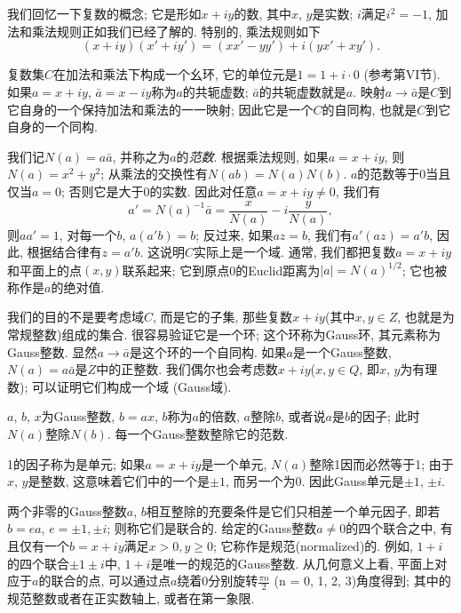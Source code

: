 \documentclass[12pt,a4paper]{book} %
\theoremstyle{remark}
\theoremstyle{example}
\theoremstyle{lemma}
\theoremstyle{corollary}
\numberwithin{theorem}{chapter}
\begin{document}
\chapter{} \label{chapter:13}
我们回忆一下复数的概念; 它是形如$x + iy$的数, 其中$x$, $y$是实数; $i$满足$i^2 = -1$, 加法和乘法规则正如我们已经了解的. 特别的, 乘法规则如下
\[
(x + iy)(x' + iy') = (xx' - yy') + i (yx' + xy').
\]

复数集$C$在加法和乘法下构成一个幺环, 它的单位元是$1 = 1 + i \cdot 0$ (参考第VI节). 如果$a = x + iy$, $\bar{a} = x - iy$称为$a$的共轭虚数; $\bar{a}$的共轭虚数就是$a$. 映射$a \rightarrow \bar{a}$是$C$到它自身的一个保持加法和乘法的一一映射; 因此它是一个$C$的自同构, 也就是$C$到它自身的一个同构.

我们记$N(a) = a\bar{a}$, 并称之为$a$的\emph{范数}. 根据乘法规则, 如果$a = x + iy$, 则$N(a) = x^2 + y^2$; 从乘法的交换性有$N(ab) = N(a)N(b)$. $a$的范数等于0当且仅当$a = 0$; 否则它是大于0的实数. 因此对任意$a = x + iy \neq 0$, 我们有
\[
a' = {N(a)}^{-1}\bar{a} = \frac{x}{N(a)} - i\frac{y}{N(a)},
\]
则$aa' = 1$, 对每一个$b$, $a(a'b) = b$; 反过来, 如果$az = b$, 我们有$a'(az) = a'b$, 因此, 根据结合律有$z = a'b$. 这说明$C$实际上是一个域. 通常, 我们都把复数$a = x + iy$和平面上的点$(x, y)$联系起来; 它到原点0的Euclid距离为$|a| = {N(a)}^{1/2}$; 它也被称作是$a$的绝对值.

我们的目的不是要考虑域$C$, 而是它的子集, 那些复数$x + iy$(其中$x, y \in Z$, 也就是为常规整数)组成的集合. 很容易验证它是一个环; 这个环称为Gauss环, 其元素称为Gauss整数. 显然$a \rightarrow \bar{a}$是这个环的一个自同构. 如果$a$是一个Gauss整数, $N(a) = a\bar{a}$是$Z$中的正整数. 我们偶尔也会考虑数$x + iy$($x, y \in Q$, 即$x$, $y$为有理数); 可以证明它们构成一个域 (Gauss域).

$a$, $b$, $x$为Gauss整数, $b = ax$, $b$称为$a$的倍数, $a$整除$b$, 或者说$a$是$b$的因子; 此时$N(a)$整除$N(b)$. 每一个Gauss整数整除它的范数.

1的因子称为是单元; 如果$a = x + iy$是一个单元, $N(a)$整除1因而必然等于1; 由于$x$, $y$是整数, 这意味着它们中的一个是$\pm 1$, 而另一个为0. 因此Gauss单元是$\pm 1$, $\pm i$.

两个非零的Gauss整数$a$, $b$相互整除的充要条件是它们只相差一个单元因子, 即若$b = ea$, $e = \pm 1, \pm i$; 则称它们是联合的. 给定的Gauss整数$a \neq 0$的四个联合之中, 有且仅有一个$b = x + iy$满足$x > 0, y \ge 0$; 它称作是规范(normalized)的. 例如, $1 + i$的四个联合$\pm 1 \pm i$中, $1 + i$是唯一的规范的Gauss整数. 从几何意义上看, 平面上对应于$a$的联合的点, 可以通过点$a$绕着0分别旋转$\frac{\pi n}{2}$ (n = 0, 1, 2, 3)角度得到; 其中的规范整数或者在正实数轴上, 或者在第一象限.
\end{document}
